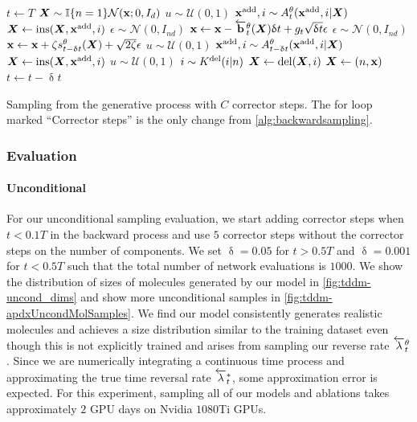 \begin{algorithm}
\begin{algorithmic}[1]
    \State $t \leftarrow T$
    \State ${\bm{X}} \sim \mathbb{I}\{ n=1\} \mathcal{N}({\mathbf{x}}; 0, I_{d})$
    \State $u \sim \mathcal{U}(0, 1)$
    \State ${\mathbf{x}}^{\textup{add}}, i \sim A_{t}^\theta({\mathbf{x}}^{\textup{add}}, i | {\bm{X}})$
    \State ${\bm{X}} \leftarrow \text{ins}({\bm{X}}, {\mathbf{x}}^{\textup{add}}, i)$
    \EndIf
    \State  $\epsilon \sim \mathcal{N}(0, I_{nd})$
    \State ${\mathbf{x}} \leftarrow {\mathbf{x}} - \overleftarrow{\mathbf{b}}_{t}^\theta({\bm{X}}) \updelta t + g_{t} \sqrt{\updelta t} \epsilon$
        \State $\epsilon \sim \mathcal{N}(0, I_{nd})$
        \State ${\mathbf{x}} \leftarrow {\mathbf{x}} + \zeta s_{t-\updelta t}^\theta({\bm{X}}) + \sqrt{2 \zeta} \epsilon$
        \State $u \sim \mathcal{U}(0, 1)$
        \State ${\mathbf{x}}^{\textup{add}}, i \sim A_{t-\updelta t}^\theta({\mathbf{x}}^{\textup{add}}, i | {\bm{X}})$
        \State ${\bm{X}} \leftarrow \text{ins}({\bm{X}}, {\mathbf{x}}^{\textup{add}}, i)$
        \EndIf
        \State $u \sim \mathcal{U}(0, 1)$
            \State $i \sim K^{\textup{del}}(i | n)$
            \State ${\bm{X}} \leftarrow \text{del}({\bm{X}}, i)$
        \EndIf
    \EndFor
    \State ${\bm{X}} \leftarrow (n, {\mathbf{x}})$
    \State $t \leftarrow t - \updelta t$
    \EndWhile
\end{algorithmic}
\caption{Sampling from the generative process with $C$ corrector steps. The for loop marked ``Corrector steps'' is the only change from \cref{alg:backwardsampling}.}
\label{alg:backwardsamplingWithCorrector}
\end{algorithm}

\subsubsection{Evaluation}
\paragraph{Unconditional}
For our unconditional sampling evaluation, we start adding corrector steps when $t<0.1T$ in the backward process and use $5$ corrector steps without the corrector steps on the number of components. We set $\updelta = 0.05$ for $ t > 0.5T$ and $\updelta = 0.001$ for $t<0.5T$ such that the total number of network evaluations is $1000$. We show the distribution of sizes of molecules generated by our model in \cref{fig:tddm-uncond_dims} and show more unconditional samples in \cref{fig:tddm-apdxUncondMolSamples}. We find our model consistently generates realistic molecules and achieves a size distribution similar to the training dataset even though this is not explicitly trained and arises from sampling our reverse rate $\overleftarrow{\lambda}_t^\theta$. Since we are numerically integrating a continuous time process and approximating the true time reversal rate $\overleftarrow{\lambda}_t^*$, some approximation error is expected. For this experiment, sampling all of our models and ablations takes approximately $2$ GPU days on Nvidia $1080$Ti GPUs.

